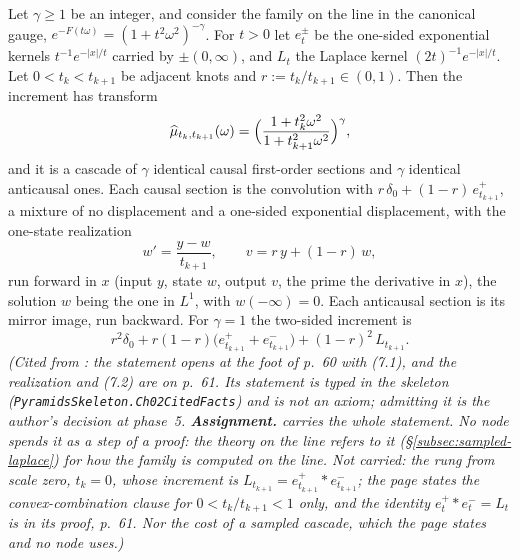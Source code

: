 \begin{theorem}
\label{thm:cited-A19}
\notready
Let $\gamma \ge 1$ be an integer, and consider the \Matern{} family on the line in the canonical
gauge, $e^{-F(t\omega)} = (1 + t^2\omega^2)^{-\gamma}$. For $t > 0$ let $e^\pm_t$ be
the one-sided exponential kernels $t^{-1}e^{-|x|/t}$ carried by $\pm(0,\infty)$, and
$L_t$ the Laplace kernel $(2t)^{-1}e^{-|x|/t}$. Let $0 < t_k < t_{k+1}$ be adjacent knots
and $r := t_k/t_{k+1} \in (0,1)$. Then the increment has transform
\[
  \widehat\mu_{t_k, t_{k+1}}(\omega) = \Bigl(\frac{1 + t_k^2\omega^2}{1 + t_{k+1}^2\omega^2}\Bigr)^{\gamma},
\]
and it is a cascade of $\gamma$ identical causal first-order sections and $\gamma$ identical
anticausal ones. Each causal section is the convolution with
$r\,\delta_0 + (1 - r)\,e^+_{t_{k+1}}$, a mixture of no displacement and a one-sided
exponential displacement, with the one-state realization
\[
  w' = \frac{y - w}{t_{k+1}}, \qquad v = r\,y + (1 - r)\,w,
\]
run forward in $x$ (input $y$, state $w$, output $v$, the prime the derivative in $x$), the
solution $w$ being the one in $L^1$, with $w(-\infty) = 0$. Each anticausal
section is its mirror image, run backward. For $\gamma = 1$ the two-sided increment is
\[
  r^2\delta_0 + r(1 - r)\bigl(e^+_{t_{k+1}} + e^-_{t_{k+1}}\bigr)
  + (1 - r)^2\,L_{t_{k+1}} .
\]
\statusA\quad{}\quad\emph{(Cited from : the
statement opens at the foot of p.~60 with (7.1), and the realization and (7.2) are on p.~61. Its statement is typed in the skeleton
(\texttt{PyramidsSkeleton.Ch02CitedFacts}) and is not an axiom; admitting it is the author's decision at phase~5. \textbf{Assignment.} 
carries the whole statement. No node spends it as a step of a proof: the theory on the line refers
to it (\S\ref{subsec:sampled-laplace}) for how the \Matern{} family is computed on the line.
Not carried: the rung from scale zero, $t_k = 0$, whose increment is
$L_{t_{k+1}} = e^+_{t_{k+1}} * e^-_{t_{k+1}}$; the page states the
convex-combination clause for $0 < t_k/t_{k+1} < 1$ only, and the identity
$e^+_t * e^-_t = L_t$ is in its proof, p.~61. Nor the cost of a
sampled cascade, which the page states and no node uses.)}
\end{theorem}

